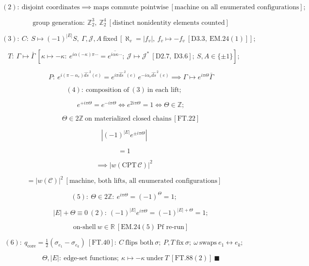 \begin{theorem}
\[
(2):\ \text{disjoint coordinates}\implies\text{maps commute pointwise}\ [\text{machine on all enumerated configurations}];
\]

\[
\qquad \text{group generation}:\ \mathbb Z_2^3,\ \mathbb Z_2^4\ [\text{distinct nonidentity elements counted}]
\]

\[
(3):\ C:\ S\mapsto(-1)^{|E|}S,\ \Gamma,\mathcal J,A\ \text{fixed}\ [\aleph_v=|f_v|,\ f_v\mapsto-f_v\ [\mathrm{D3.3},\ \mathrm{EM.24}(1)]];
\]

\[
T:\ \Gamma\mapsto\bar\Gamma\ [\kappa\mapsto-\kappa:\ e^{i\alpha(-\kappa)\pi\cdots}=\overline{e^{i\alpha\kappa\cdots}};\ \mathcal J\mapsto\mathcal J^{*}\ [\mathrm{D2.7},\ \mathrm{D3.6}];\ S,A\in\{\pm1\}];
\]

\[
\qquad P:\ e^{i(\pi-\alpha_e)\widehat{ds}^{\,2}(e)}=e^{i\pi\widehat{ds}^{\,2}(e)}\,e^{-i\alpha_e\widehat{ds}^{\,2}(e)}\implies\Gamma\mapsto e^{i\pi\Theta}\bar\Gamma
\]

\[
(4):\ \text{composition of}\ (3)\ \text{in each lift};
\]

\[
\qquad e^{+i\pi\Theta}=e^{-i\pi\Theta}\iff e^{2i\pi\Theta}=1\iff\Theta\in\mathbb Z;
\]

\[
\qquad \Theta\in2\mathbb Z\ \text{on materialized closed chains}\ [\mathrm{FT.22}]
\]

\[
|(-1)^{|E|}e^{\pm i\pi\Theta}|
\]

\[
= 1
\]

\[
\implies |w(\mathrm{CPT}\,\mathcal C)|^2
\]

\[
= |w(\mathcal C)|^2\ [\text{machine, both lifts, all enumerated configurations}]
\]

\[
(5):\ \Theta\in2\mathbb Z:\ e^{i\pi\Theta}=(-1)^{\Theta}=1;
\]

\[
\qquad |E|+\Theta\equiv0\ (2):\ (-1)^{|E|}e^{i\pi\Theta}=(-1)^{|E|+\Theta}=1;
\]

\[
\qquad \text{on-shell}\ w\in\mathbb R\ [\mathrm{EM.24}(5)\ \text{Pf re-run}]
\]

\[
(6):\ q_{\mathrm{core}}=\tfrac12(\sigma_{e_1}-\sigma_{e_k})\ [\mathrm{FT.40}]:\ C\ \text{flips both}\ \sigma;\ P,T\ \text{fix}\ \sigma;\ \omega\ \text{swaps}\ e_1\leftrightarrow e_k;
\]

\[
\qquad \Theta,|E|:\ \text{edge-set functions};\ \kappa\mapsto-\kappa\ \text{under}\ T\ [\mathrm{FT.88}(2)]\ \blacksquare
\]


\end{theorem}
